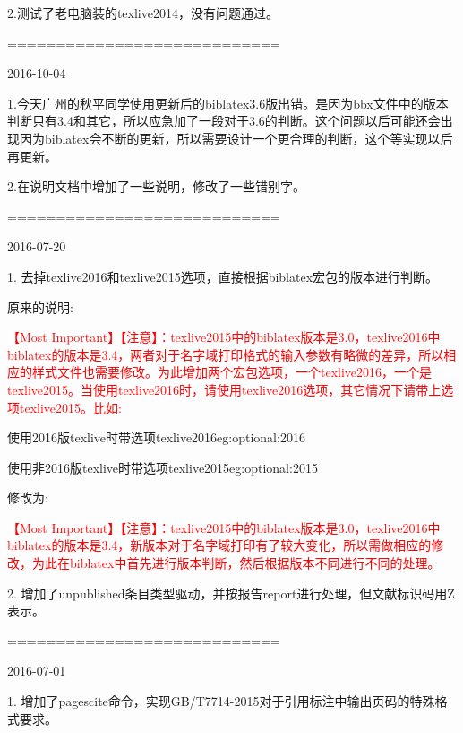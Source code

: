 2.测试了老电脑装的texlive2014，没有问题通过。


============================

2016-10-04

1.今天广州的秋平同学使用更新后的biblatex3.6版出错。是因为bbx文件中的版本判断只有3.4和其它，所以应急加了一段对于3.6的判断。这个问题以后可能还会出现因为biblatex会不断的更新，所以需要设计一个更合理的判断，这个等实现以后再更新。

2.在说明文档中增加了一些说明，修改了一些错别字。

============================

2016-07-20

1. 去掉texlive2016和texlive2015选项，直接根据biblatex宏包的版本进行判断。

原来的说明:
\begin{texlist}
    \textcolor{red}{\HandRight \heiti 【Most Important】【注意】：texlive2015中的biblatex版本是3.0，texlive2016中biblatex的版本是3.4，两者对于名字域打印格式的输入参数有略微的差异，所以相应的样式文件也需要修改。为此增加两个宏包选项，一个texlive2016，一个是texlive2015。当使用texlive2016时，请使用texlive2016选项，其它情况下请带上选项texlive2015。比如:}

    \begin{codetex}{使用2016版texlive时带选项texlive2016}{eg:optional:2016}
    \usepackage[backend=biber,texlive2016,style=gb7714-2015]{biblatex}
    \end{codetex}

    \begin{codetex}{使用非2016版texlive时带选项texlive2015}{eg:optional:2015}
    \usepackage[backend=biber,texlive2015,style=gb7714-2015]{biblatex}
    \end{codetex}
\end{texlist}

修改为:
\begin{texlist}
    \textcolor{red}{\HandRight \heiti 【Most Important】【注意】：texlive2015中的biblatex版本是3.0，texlive2016中biblatex的版本是3.4，新版本对于名字域打印有了较大变化，所以需做相应的修改，为此在biblatex中首先进行版本判断，然后根据版本不同进行不同的处理。}
\end{texlist}

2. 增加了unpublished条目类型驱动，并按报告report进行处理，但文献标识码用Z表示。

============================

2016-07-01

1. 增加了pagescite命令，实现GB/T7714-2015对于引用标注中输出页码的特殊格式要求。

